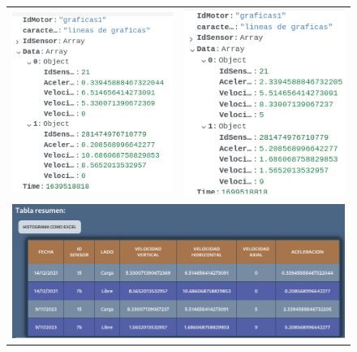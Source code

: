 \documentclass[12pt]{article}
\begin{document}
\begin{refsegment}
\begin{figure}[H]
\begin{tabular}{m{8cm}m{8cm}}
            \includegraphics[width=8cm]{comprobacion_resultados/finales/graficas1Mongo1.png}&
            \includegraphics[width=8cm]{comprobacion_resultados/finales/graficas1Mongo2.png}\\
            \multicolumn{2}{c}{\includegraphics[width=12cm]{comprobacion_resultados/finales/tablaGraficas1.png}}
        \end{tabular}
        \label{img:GraficasHistoricas}
    \end{figure}



\end{refsegment}
\end{document}
